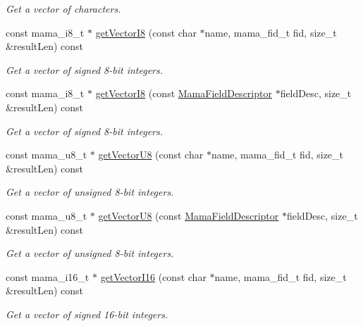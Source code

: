 \begin{DoxyCompactItemize}
\begin{DoxyCompactList}\small\item\em Get a vector of characters. \item\end{DoxyCompactList}\item 
const mama\_\-i8\_\-t $\ast$ \hyperlink{classWombat_1_1MamaMsg_af5ded730cd2b71b03663d58813a072d6}{getVectorI8} (const char $\ast$name, mama\_\-fid\_\-t fid, size\_\-t \&resultLen) const 
\begin{DoxyCompactList}\small\item\em Get a vector of signed 8-\/bit integers. \item\end{DoxyCompactList}\item 
const mama\_\-i8\_\-t $\ast$ \hyperlink{classWombat_1_1MamaMsg_af8e3ac71ac6ca40bbc04525bd8979880}{getVectorI8} (const \hyperlink{classWombat_1_1MamaFieldDescriptor}{MamaFieldDescriptor} $\ast$fieldDesc, size\_\-t \&resultLen) const 
\begin{DoxyCompactList}\small\item\em Get a vector of signed 8-\/bit integers. \item\end{DoxyCompactList}\item 
const mama\_\-u8\_\-t $\ast$ \hyperlink{classWombat_1_1MamaMsg_ac47f96489957fe9338bf26fbc13c51fe}{getVectorU8} (const char $\ast$name, mama\_\-fid\_\-t fid, size\_\-t \&resultLen) const 
\begin{DoxyCompactList}\small\item\em Get a vector of unsigned 8-\/bit integers. \item\end{DoxyCompactList}\item 
const mama\_\-u8\_\-t $\ast$ \hyperlink{classWombat_1_1MamaMsg_a14fb3ec53d33e1f7d85bc8fa1eb84e63}{getVectorU8} (const \hyperlink{classWombat_1_1MamaFieldDescriptor}{MamaFieldDescriptor} $\ast$fieldDesc, size\_\-t \&resultLen) const 
\begin{DoxyCompactList}\small\item\em Get a vector of unsigned 8-\/bit integers. \item\end{DoxyCompactList}\item 
const mama\_\-i16\_\-t $\ast$ \hyperlink{classWombat_1_1MamaMsg_a2c97bdf7d33d0306b7392eb33dad6109}{getVectorI16} (const char $\ast$name, mama\_\-fid\_\-t fid, size\_\-t \&resultLen) const 
\begin{DoxyCompactList}\small\item\em Get a vector of signed 16-\/bit integers. \item\end{DoxyCompactList}\item 

\end{DoxyCompactItemize}
